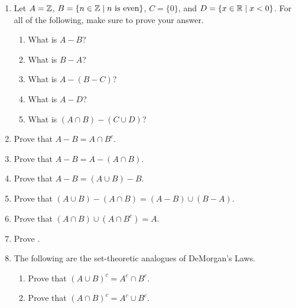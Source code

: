 \probsec{~\ref{sec:compl-set-diff}}
\begin{enumerate}
    \item Let $A = \mathbb{Z}$, $B = \{n \in \mathbb{Z} \mid n \text{ is even}\}$, $C = \{0\}$, and $D = \{x \in \mathbb{R} \mid x <0\}$. For all of the following, make sure to prove your answer.
  \begin{enumerate}
      \item What is $A - B$?
      \item What is $B - A$?
      \item What is $A - (B - C)$?
      \item What is $A - D$?
      \item What is $(A \cap B) - (C \cup D)$?
  \end{enumerate}

    \item Prove that $A - B = A \cap B^c$.

    \item Prove that $A - B = A - (A \cap B)$.

    \item Prove that $A - B = (A \cup B) - B$.

    \item Prove that $(A \cup B) - (A \cap B) = (A - B) \cup (B - A)$.

    \item Prove that $(A \cap B) \cup (A \cap B^c) = A$.

    \item Prove .

    \item The following are the set-theoretic analogues of DeMorgan's Laws.
  \begin{enumerate}
      \item Prove that $(A \cup B)^c = A^c \cap B^c$.
      \item Prove that $(A \cap B)^c = A^c \cup B^c$.
  \end{enumerate}

\end{enumerate}
